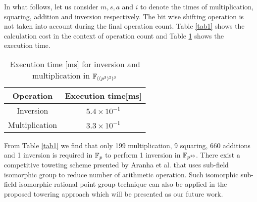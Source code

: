 In what follows, let us consider $m,s,a$ and $i$ to denote the times of multiplication, squaring, addition and inversion respectively. The bit wise shifting operation is not taken into account during the final operation count.
Table \ref{tab1} shows the calculation cost in the context of  operation count and Table \ref{tab3} shows the execution time.
\renewcommand{\baselinestretch}{1.5}
\begin{table}[!ht]
\renewcommand{\arraystretch}{1.3}
\centering
\caption{$\FQTHTWTH$ operation count}
\label{tab1}
\end{table}


\begin{table}[!ht]
\renewcommand{\arraystretch}{1.3}
\centering
\caption{Execution time [ms] for inversion and multiplication in $\FQTHTWTH$}
\label{tab3}
\begin{tabular}{c|c}
\hline 
Operation & Execution time[ms] \\ 
\hline\hline 
Inversion &  $5.4 \times  10^{-1}$ \\
\hline
Multiplication & $3.3 \times  10^{-1}$ \\
\hline  
\end{tabular}
\end{table}
\renewcommand{\baselinestretch}{1.0}
From Table \ref{tab1} we find that only 199 multiplication, 9 squaring, 660 additions and 1 inversion is required in ${\mathbb{F}}_{p}$ to perform 1 inversion in $\mathbb{F}_{p^{18}}$.
There exist a competitive toweting scheme prsented by Aranha et al. \cite{PAIRING:AFKMR12} that uses sub-field isomorphic group to reduce number of arithmetic operation. Such isomorphic sub-field isomorphic rational point group technique can also be applied in the proposed towering approach which will be presented as our future work.
